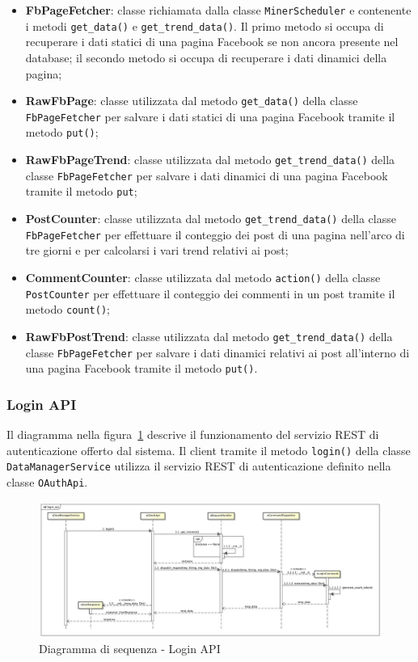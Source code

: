     \begin{itemize}
        \item \textbf{FbPageFetcher}: classe richiamata dalla classe \texttt{MinerScheduler} e contenente i metodi \texttt{get\_data()} e \texttt{get\_trend\_data()}. Il primo metodo si occupa di recuperare i dati statici di una pagina Facebook se non ancora presente nel database; il secondo metodo si occupa di recuperare i dati dinamici della pagina;
        \item \textbf{RawFbPage}: classe utilizzata dal metodo \texttt{get\_data()} della classe \texttt{FbPageFetcher} per salvare i dati statici di una pagina Facebook tramite il metodo \texttt{put()};
        \item \textbf{RawFbPageTrend}: classe utilizzata dal metodo \texttt{get\_trend\_data()} della classe \texttt{FbPageFetcher} per salvare i dati dinamici di una pagina Facebook tramite il metodo \texttt{put};
        \item \textbf{PostCounter}: classe utilizzata dal metodo \texttt{get\_trend\_data()} della classe \texttt{FbPageFetcher} per effettuare il conteggio dei post di una pagina nell'arco di tre giorni e per calcolarsi i vari trend relativi ai post;
        \item \textbf{CommentCounter}: classe utilizzata dal metodo \texttt{action()} della classe \texttt{PostCounter} per effettuare il conteggio dei commenti in un post tramite il metodo \texttt{count()};
        \item \textbf{RawFbPostTrend}: classe utilizzata dal metodo \texttt{get\_trend\_data()} della classe \texttt{FbPageFetcher} per salvare i dati dinamici relativi ai post all'interno di una pagina Facebook tramite il metodo \texttt{put()}.
    \end{itemize}


	\subsubsection{Login API} %
    \label{ssub:login_api}
    Il diagramma nella figura~\ref{fig:login_api} descrive il funzionamento del servizio REST di autenticazione offerto dal sistema. Il client tramite il metodo \texttt{login()} della classe \texttt{DataManagerService} utilizza il servizio REST di autenticazione definito nella classe \texttt{OAuthApi}. \newline

    \begin{figure}[!htbp]
		\centering
			\centerline{\includegraphics[angle=90, scale=0.4]{./images/sequence_diagram/login_api.pdf}}
		\caption{Diagramma di sequenza - Login API}
        \label{fig:login_api}
	\end{figure}


